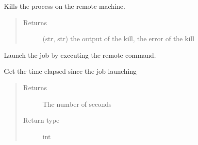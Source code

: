 \documentclass[a4paper,10pt,english]{sphinxmanual}
\begin{document}
\begin{fulllineitems}
\begin{fulllineitems}
\begin{quote}
\begin{description}
\end{description}\end{quote}

\end{fulllineitems}


\begin{fulllineitems}
\label{\detokenize{apidoc_commands/commands:commands.jobs.Job.kill_remote_process}}
Kills the process on the remote machine.
\begin{quote}\begin{description}
\item[{Returns}] \leavevmode
(str, str) the output of the kill, the error of the kill

\end{description}\end{quote}

\end{fulllineitems}


\begin{fulllineitems}
\label{\detokenize{apidoc_commands/commands:commands.jobs.Job.run}}
Launch the job by executing the remote command.

\end{fulllineitems}


\begin{fulllineitems}
\label{\detokenize{apidoc_commands/commands:commands.jobs.Job.time_elapsed}}
Get the time elapsed since the job launching
\begin{quote}\begin{description}
\item[{Returns}] \leavevmode
The number of seconds

\item[{Return type}] \leavevmode
int

\end{description}\end{quote}

\end{fulllineitems}


\end{fulllineitems}
\end{document}
